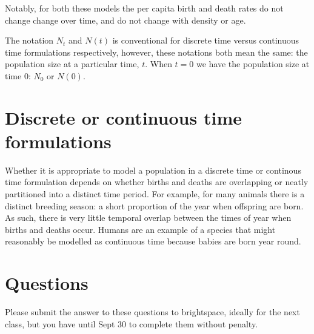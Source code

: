 \documentclass[]{book}
\begin{document}
Notably, for both these models the per capita birth and death rates do
not change change over time, and do not change with density or age.

The notation \(N_t\) and \(N(t)\) is conventional for discrete time
versus continuous time formulations respectively, however, these
notations both mean the same: the population size at a particular time,
\(t\). When \(t=0\) we have the population size at time 0: \(N_0\) or
\(N(0)\).

\section{Discrete or continuous time
formulations}\label{discrete-or-continuous-time-formulations}

Whether it is appropriate to model a population in a discrete time or
continous time formulation depends on whether births and deaths are
overlapping or neatly partitioned into a distinct time period. For
example, for many animals there is a distinct breeding season: a short
proportion of the year when offspring are born. As such, there is very
little temporal overlap between the times of year when births and deaths
occur. Humans are an example of a species that might reasonably be
modelled as continuous time because babies are born year round.

\section{Questions}\label{questions-6}

Please submit the answer to these questions to brightspace, ideally for
the next class, but you have until Sept 30 to complete them without
penalty.
\end{document}
